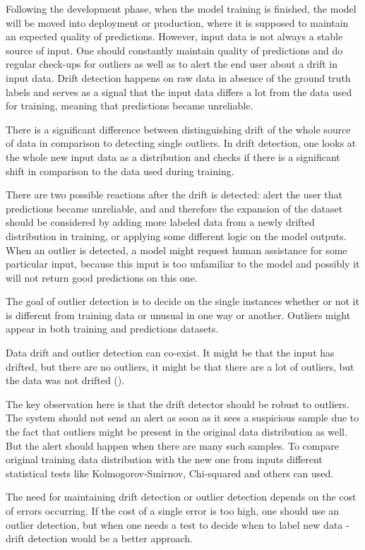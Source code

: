 Following the development phase, when the model training is finished, the model will be moved into deployment or production, where it is supposed to maintain an expected quality of predictions. However, input data is not always a stable source of input. One should constantly maintain quality of predictions and do regular check-ups for outliers as well as to alert the end user about a drift in input data. Drift detection happens on raw data in absence of the ground truth labels and serves as a signal that the input data differs a lot from the data used for training, meaning that predictions became unreliable.

There is a significant difference between distinguishing drift of the whole source of data in comparison to detecting single outliers. In drift detection, one looks at the whole new input data as a distribution and checks if there is a significant shift in comparison to the data used during training.

There are two possible reactions after the drift is detected: alert the user that predictions became unreliable, and and therefore the expansion of the dataset should be considered by adding more labeled data from a newly drifted distribution in training, or applying some different logic on the model outputs. When an outlier is detected, a model might request human assistance for some particular input, because this input is too unfamiliar to the model and possibly it will not return good predictions on this one.

The goal of outlier detection is to decide on the single instances whether or not it is different from training data or unusual in one way or another. Outliers might appear in both training and predictions datasets.

Data drift and outlier detection can co-exist. It might be that the input has drifted, but there are no outliers, it might be that there are a lot of outliers, but the data was not drifted (\cite{samuylova_2021}).

The key observation here is that the drift detector should be robust to outliers. The system should not send an alert as soon as it sees a suspicious sample due to the fact that outliers might be present in the original data distribution as well. But the alert should happen when there are many such samples. To compare original training data distribution with the new one from inputs different statistical tests like Kolmogorov-Smirnov, Chi-squared and others can used.

The need for maintaining drift detection or outlier detection depends on the cost of errors occurring. If the cost of a single error is too high, one should use an outlier detection, but when one needs a test to decide when to label new data - drift detection would be a better approach.

